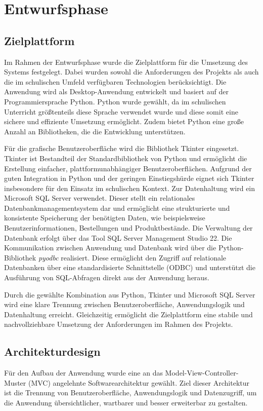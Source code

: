 \section{Entwurfsphase} 
\label{sec:Entwurfsphase}

\subsection{Zielplattform}
\label{sec:Zielplattform}
Im Rahmen der Entwurfsphase wurde die Zielplattform für die Umsetzung des Systems festgelegt. Dabei wurden sowohl die
Anforderungen des Projekts als auch die im schulischen Umfeld verfügbaren Technologien berücksichtigt. Die Anwendung wird als Desktop-Anwendung
entwickelt und basiert auf der Programmiersprache Python. Python wurde gewählt, da im schulischen Unterricht größtenteils diese Sprache verwendet
wurde und diese somit eine sichere und effiziente Umsetzung ermöglicht. Zudem bietet Python eine große Anzahl an Bibliotheken, die die Entwicklung unterstützen.

Für die grafische Benutzeroberfläche wird die Bibliothek Tkinter eingesetzt. Tkinter ist Bestandteil der Standardbibliothek von
Python und ermöglicht die Erstellung einfacher, plattformunabhängiger Benutzeroberflächen. Aufgrund der guten Integration in Python
und der geringen Einstiegshürde eignet sich Tkinter insbesondere für den Einsatz im schulischen Kontext.
Zur Datenhaltung wird ein Microsoft SQL Server verwendet. Dieser stellt ein relationales Datenbankmanagementsystem dar und
ermöglicht eine strukturierte und konsistente Speicherung der benötigten Daten, wie beispielsweise Benutzerinformationen, Bestellungen
und Produktbestände. Die Verwaltung der Datenbank erfolgt über das Tool SQL Server Management Studio 22.
Die Kommunikation zwischen Anwendung und Datenbank wird über die Python-Bibliothek \emph{pyodbc} realisiert. Diese ermöglicht den
Zugriff auf relationale Datenbanken über eine standardisierte Schnittstelle (\acs{ODBC}) und unterstützt die Ausführung von \acs{SQL}-Abfragen direkt
aus der Anwendung heraus.

Durch die gewählte Kombination aus Python, Tkinter und Microsoft SQL Server wird eine klare Trennung zwischen Benutzeroberfläche, Anwendungslogik
und Datenhaltung erreicht. Gleichzeitig ermöglicht die Zielplattform eine stabile und nachvollziehbare Umsetzung der Anforderungen im Rahmen des Projekts.

\subsection{Architekturdesign}
\label{sec:Architekturdesign}
Für den Aufbau der Anwendung wurde eine an das Model-View-Controller-Muster (\acs{MVC}) angelehnte Softwarearchitektur gewählt. Ziel dieser Architektur
ist die Trennung von Benutzeroberfläche, Anwendungslogik und Datenzugriff, um die Anwendung übersichtlicher, wartbarer und besser erweiterbar zu gestalten.

